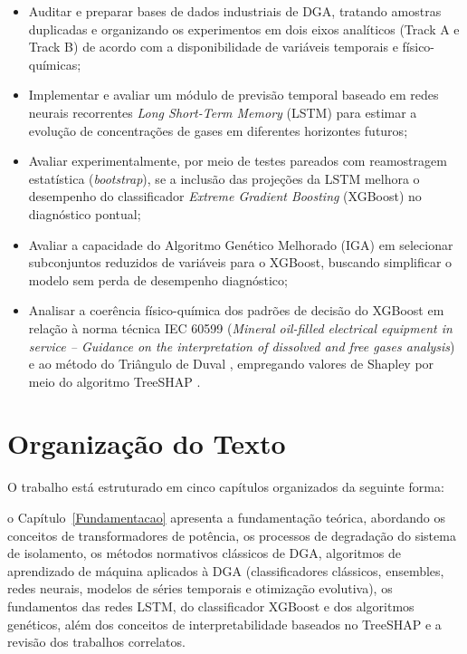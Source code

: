 \begin{itemize}
    \item Auditar e preparar bases de dados industriais de DGA, tratando amostras duplicadas e organizando os experimentos em dois eixos analíticos (Track A e Track B) de acordo com a disponibilidade de variáveis temporais e físico-químicas;
    \item Implementar e avaliar um módulo de previsão temporal baseado em redes neurais recorrentes \textit{Long Short-Term Memory} (LSTM) \cite{hochreiter1997long} para estimar a evolução de concentrações de gases em diferentes horizontes futuros;
    \item Avaliar experimentalmente, por meio de testes pareados com reamostragem estatística (\textit{bootstrap}), se a inclusão das projeções da LSTM melhora o desempenho do classificador \textit{Extreme Gradient Boosting} (XGBoost) \cite{chen2016_xgboost} no diagnóstico pontual;
    \item Avaliar a capacidade do Algoritmo Genético Melhorado (IGA) \cite{wu2021} em selecionar subconjuntos reduzidos de variáveis para o XGBoost, buscando simplificar o modelo sem perda de desempenho diagnóstico;
    \item Analisar a coerência físico-química dos padrões de decisão do XGBoost em relação à norma técnica IEC 60599 (\textit{Mineral oil-filled electrical equipment in service -- Guidance on the interpretation of dissolved and free gases analysis}) \cite{iec60599_2022} e ao método do Triângulo de Duval \cite{duval2002_review}, empregando valores de Shapley \cite{shapley1953,lundberg2017} por meio do algoritmo TreeSHAP \cite{lundberg2020}.
\end{itemize}

\section{Organização do Texto}\label{organizacao}

O trabalho está estruturado em cinco capítulos organizados da seguinte forma:

o Capítulo~\ref{Fundamentacao} apresenta a fundamentação teórica, abordando os conceitos de transformadores de potência, os processos de degradação do sistema de isolamento, os métodos normativos clássicos de DGA, algoritmos de aprendizado de máquina aplicados à DGA (classificadores clássicos, ensembles, redes neurais, modelos de séries temporais e otimização evolutiva), os fundamentos das redes LSTM, do classificador XGBoost e dos algoritmos genéticos, além dos conceitos de interpretabilidade baseados no TreeSHAP e a revisão dos trabalhos correlatos.

